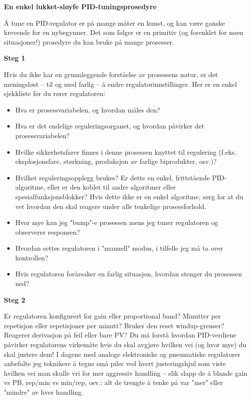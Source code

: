 \vfil \eject

\centerline{\bf En enkel lukket-sløyfe PID-tuningsprosedyre}

\vskip 10pt

Å tune en PID-regulator er på mange måter en kunst, og kan være ganske krevende for en nybegynner.  Det som følger er en primitiv (og forenklet for noen situasjoner!) prosedyre du kan bruke på mange prosesser.

\vskip 10pt

\noindent
{\bf Steg 1}

  Hvis du ikke har en grunnleggende forståelse av prosessens natur, er det meningsløst -- til og med farlig -- å endre regulatorinnstillinger.  Her er en enkel sjekkliste før du rører regulatoren:

\begin{itemize}
\item{} Hva er prosessvariabelen, og hvordan måles den?
\item{} Hva er det endelige reguleringsorganet, og hvordan påvirker det prosessvariabelen?
\item{} Hvilke sikkerhetsfarer finnes i denne prosessen knyttet til regulering (f.eks. eksplosjonsfare, størkning, produksjon av farlige biprodukter, osv.)?
\item{} Hvilket reguleringsopplegg brukes?  Er dette en enkel, frittstående PID-algoritme, eller er den koblet til andre algoritmer eller spesialfunksjonsblokker?  Hvis dette ikke er en enkel algoritme, sørg for at du vet hvordan den skal reagere under alle tenkelige prosessforhold.
\item{} Hvor mye kan jeg "bump"-e prosessen mens jeg tuner regulatoren og observerer responsen?
\item{} Hvordan settes regulatoren i "manuell" modus, i tilfelle jeg må ta over kontrollen?
\item{} Hvis regulatoren forårsaker en farlig situasjon, hvordan stenger du prosessen ned?
\end{itemize}

\vskip 10pt

\noindent
{\bf Steg 2}

  Er regulatoren konfigurert for gain eller proportional band?  Minutter per repetisjon eller repetisjoner per minutt?  Bruker den reset windup-grenser?  Reagerer derivasjon på feil eller bare PV?  Du må forstå hvordan PID-verdiene påvirker regulatorens virkemåte hvis du skal avgjøre hvilken vei (og hvor mye) du skal justere dem!  I dagene med analoge elektroniske og pneumatiske regulatorer anbefalte jeg teknikere å tegne små piler ved hvert justeringshjul som viste hvilken vei man skulle vri for mer aggressiv handling -- slik slapp de å blande gain vs PB, rep/min vs min/rep, osv.: alt de trengte å tenke på var "mer" eller "mindre" av hver handling.

